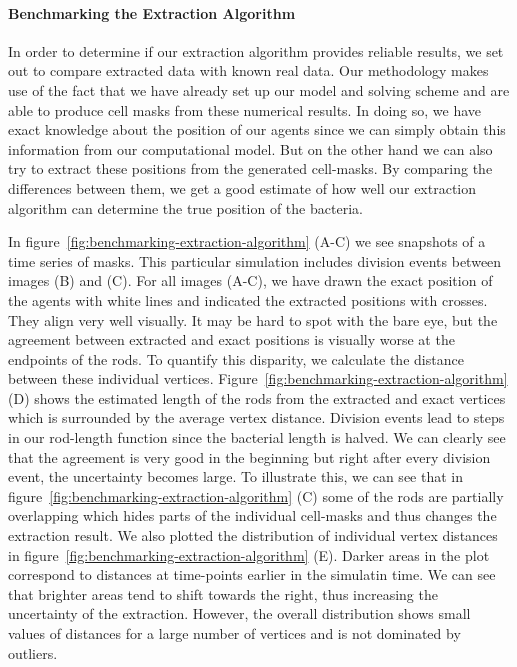 \documentclass[10pt,letterpaper]{article}
\begin{document}
\paragraph{Benchmarking the Extraction Algorithm}

In order to determine if our extraction algorithm provides reliable results, we set out to compare
extracted data with known real data.
Our methodology makes use of the fact that we have already set up our model and solving scheme and
are able to produce cell masks from these numerical results.
In doing so, we have exact knowledge about the position of our agents since we can simply obtain
this information from our computational model.
But on the other hand we can also try to extract these positions from the generated cell-masks.
By comparing the differences between them, we get a good estimate of how well our extraction
algorithm can determine the true position of the bacteria.

In figure~\ref{fig:benchmarking-extraction-algorithm} (A-C) we see snapshots of a time series of
masks.
This particular simulation includes division events between images (B) and (C).
For all images (A-C), we have drawn the exact position of the agents with white lines and indicated
the extracted positions with crosses.
They align very well visually.
It may be hard to spot with the bare eye, but the agreement between extracted and exact positions is
visually worse at the endpoints of the rods.
To quantify this disparity, we calculate the distance between these individual vertices.
Figure~\ref{fig:benchmarking-extraction-algorithm} (D) shows the estimated length of the rods from
the extracted and exact vertices which is surrounded by the average vertex distance.
Division events lead to steps in our rod-length function since the bacterial length is halved.
We can clearly see that the agreement is very good in the beginning but right after every division
event, the uncertainty becomes large.
To illustrate this, we can see that in figure~\ref{fig:benchmarking-extraction-algorithm} (C) some
of the rods are partially overlapping which hides parts of the individual cell-masks and thus
changes the extraction result.
We also plotted the distribution of individual vertex distances in
figure~\ref{fig:benchmarking-extraction-algorithm} (E).
Darker areas in the plot correspond to distances at time-points earlier in the simulatin time.
We can see that brighter areas tend to shift towards the right, thus increasing the uncertainty of
the extraction.
However, the overall distribution shows small values of distances for a large number of vertices and
is not dominated by outliers.
\end{document}

